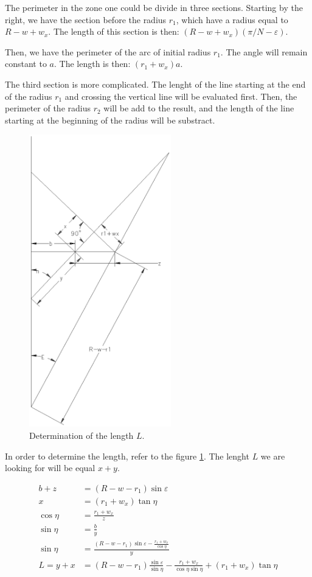 \documentclass[11pt, titlepage]{article}
\begin{document}
  The perimeter in the zone one could be divide in three
  sections. Starting by the right, we have the section before the
  radius $r_1$, which have a radius equal to $R-w+w_x$. The length of
  this section is then: $(R-w+w_x)(\pi/N - \varepsilon)$.

  Then, we have the perimeter of the arc of initial radius $r_1$. The
  angle will remain constant to $a$. The length is then: $(r_1+w_x)a$.

  The third section is more complicated. The lenght of the line
  starting at the end of the radius $r_1$ and crossing the vertical
  line will be evaluated first. Then, the perimeter of the radius
  $r_2$ will be add to the result, and the length of the line starting
  at the beginning of the radius will be substract.

\begin{figure}
 \begin{center}
 \includegraphics[height=5in]{img/starL.ps}
      \caption{Determination of the length $L$.}\label{len}
 \end{center}
\end{figure}

  In order to determine the length, refer to the figure \ref{len}. The
  lenght $L$ we are looking for will be equal $x + y$.

\begin{align*}
     b + z &= (R-w-r_1)\sin{\varepsilon}\\
         x &= (r_1+w_x)\tan{\eta}\\
\cos{\eta} &= \frac{r_1+w_x}{z}\\
\sin{\eta} &= \frac{b}{y}\\
\sin{\eta} &= \frac{(R-w-r_1)\sin{\varepsilon} -
    \frac{r_1+w_x}{\cos{\eta}}}{y}\\
 L = y + x &= (R-w-r_1)\frac{\sin{\varepsilon}}{\sin{\eta}} - 
              \frac{r_1+w_x}{\cos{\eta}\sin{\eta}} +
              (r_1+w_x)\tan{\eta}
\end{align*}
\end{document}
